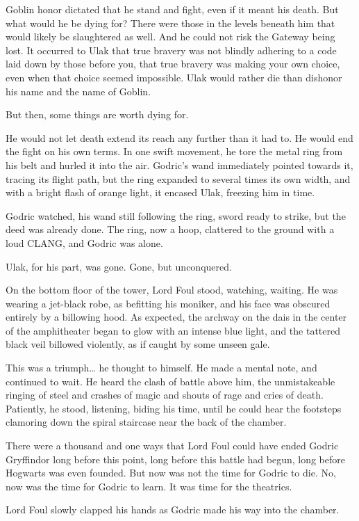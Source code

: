 Goblin honor dictated that he stand and fight, even if it meant his death. But what would he be dying for? There were those in the levels beneath him that would likely be slaughtered as well. And he could not risk the Gateway being lost. It occurred to Ulak that true bravery was not blindly adhering to a code laid down by those before you, that true bravery was making your own choice, even when that choice seemed impossible. Ulak would rather die than dishonor his name and the name of Goblin.

But then, some things are worth dying for.

He would not let death extend its reach any further than it had to. He would end the fight on his own terms. In one swift movement, he tore the metal ring from his belt and hurled it into the air. Godric’s wand immediately pointed towards it, tracing its flight path, but the ring expanded to several times its own width, and with a bright flash of orange light, it encased Ulak, freezing him in time.

Godric watched, his wand still following the ring, sword ready to strike, but the deed was already done. The ring, now a hoop, clattered to the ground with a loud CLANG, and Godric was alone.

Ulak, for his part, was gone. Gone, but unconquered.

On the bottom floor of the tower, Lord Foul stood, watching, waiting. He was wearing a jet-black robe, as befitting his moniker, and his face was obscured entirely by a billowing hood. As expected, the archway on the dais in the center of the amphitheater began to glow with an intense blue light, and the tattered black veil billowed violently, as if caught by some unseen gale.

This was a triumph… he thought to himself. He made a mental note, and continued to wait. He heard the clash of battle above him, the unmistakeable ringing of steel and crashes of magic and shouts of rage and cries of death. Patiently, he stood, listening, biding his time, until he could hear the footsteps clamoring down the spiral staircase near the back of the chamber.

There were a thousand and one ways that Lord Foul could have ended Godric Gryffindor long before this point, long before this battle had begun, long before Hogwarts was even founded. But now was not the time for Godric to die. No, now was the time for Godric to learn. It was time for the theatrics.

Lord Foul slowly clapped his hands as Godric made his way into the chamber.

